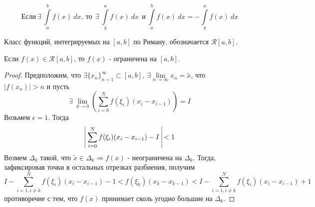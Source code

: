 \begin{statement}
    \[\text{Если}\ \exists\ \int\limits_{a}^{b}f(x)\ dx,\ \text{то}\ \ \exists\ \int\limits_{b}^{a}f(x)\ dx\ \ \text{и}\ \int\limits_{a}^{b}f(x)\ dx=-\int\limits_{b}^{a}f(x)\ dx\]
\end{statement} 
\begin{definition}
    Класс функций, интегрируемых на $[a,b]$ по Риману, обозначается $\mathcal{R}[a,b]$.
\end{definition} 
\begin{theorem}
    Если $f(x)\in \mathcal{R}[a,b]$, то $f(x)$ - ограничена на $[a,b]$.
\end{theorem} 
\begin{proof}
    Предположим, что $\exists \{x_n\}_{n=1}^{\infty}\subset [a,b],\ \exists \lim\limits_{n\to \infty}x_n=\widetilde{x}$, что\\
    $|f(x_n)|>n$ и пусть
    \[\exists\ \lim\limits_{d\to 0}\left( \sum\limits_{i=0}^{N}f(\xi_i)(x_i-x_{i-1}) \right)=I\] 
    Возьмем $\epsilon=1$. Тогда  
    \[\vline\ \sum\limits_{i=0}^{N}f(\xi_i)(x_i-x_{i-1})-I\ \vline<1\]
    Возмем $\Delta_k$ такой, что $\widetilde{x}\in \Delta_k \Rightarrow f(x)$ - неограничена на $\Delta_k$. Тогда, зафиксировав точки в остальных отрезках разбиения, получим
    \[I-\sum\limits_{i=1,i\ne k}^{N} f(\xi_i)(x_i-x_{i-1})-1<f(\xi_k)(x_k-x_{k-1})<I-\sum\limits_{i=1,i\ne k}^{N} f(\xi_i)(x_i-x_{i-1})+1\]
    противоречие с тем, что $f(x)$ принимает сколь угодно большие  на $\Delta_k$.
\end{proof} 

